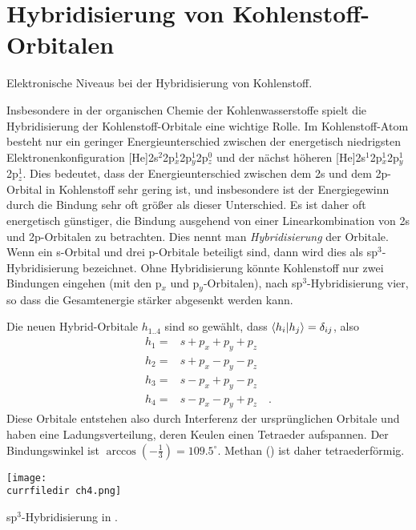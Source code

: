 \section{Hybridisierung von Kohlenstoff-Orbitalen}
%
\begin{marginfigure}
\caption{Elektronische Niveaus bei der Hybridisierung von Kohlenstoff. }
\end{marginfigure}
%
Insbesondere in der organischen Chemie der Kohlenwasserstoffe spielt die Hybridisierung der Kohlenstoff-Orbitale eine wichtige Rolle. Im Kohlenstoff-Atom besteht nur ein geringer Energieunterschied zwischen der energetisch niedrigsten Elektronenkonfiguration
[He]2s$^2$2p$_x^1$2p$_y^1$2p$_z^0$ und der nächst höheren [He]2s$^1$2p$_x^1$2p$_y^1$2p$_z^1$. Dies bedeutet, dass der Energieunterschied zwischen dem 2s und dem 2p-Orbital in Kohlenstoff sehr gering ist, und insbesondere 
ist der Energiegewinn durch die Bindung sehr oft größer als dieser Unterschied. Es ist daher oft energetisch günstiger, die Bindung ausgehend von einer Linearkombination von 2s und 2p-Orbitalen zu betrachten. Dies nennt man \emph{Hybridisierung} der Orbitale. Wenn ein s-Orbital und drei p-Orbitale beteiligt sind, dann wird dies als sp$^3$-Hybridisierung bezeichnet. Ohne Hybridisierung könnte Kohlenstoff nur zwei Bindungen eingehen (mit den p$_x$ und p$_y$-Orbitalen), nach sp$^3$-Hybridisierung vier, so dass die Gesamtenergie stärker abgesenkt werden kann.

Die neuen Hybrid-Orbitale $h_{1 .. 4}$ sind so gewählt, dass $\braket{h_i | h_j} = \delta_{ij}$, also
\begin{align}
 h_1 = & s + p_x + p_y + p_z \\
 h_2 = & s + p_x - p_y - p_z \\
 h_3 = & s - p_x + p_y - p_z \\
 h_4 = & s - p_x - p_y + p_z  \quad .
\end{align}
Diese Orbitale entstehen also durch Interferenz der ursprünglichen Orbitale und haben eine Ladungsverteilung, deren Keulen einen Tetraeder aufspannen. Der Bindungswinkel ist $\arccos (-\frac{1}{3}) = 109.5^\circ$. Methan () ist daher tetraederförmig.

\begin{marginfigure}
\texttt{[image: \\currfiledir ch4.png]}
\caption{sp$^3$-Hybridisierung in . }
\end{marginfigure}


